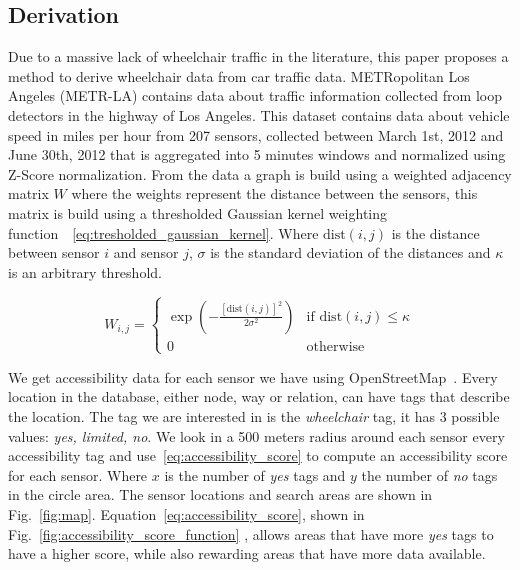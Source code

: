 \subsection{Derivation}\label{subsec:derivation}
Due to a massive lack of wheelchair traffic in the literature, this paper proposes a method to derive wheelchair data
from car traffic data.
METRopolitan Los Angeles (METR-LA) contains data about traffic information collected from loop detectors in the highway
of Los Angeles.
This dataset contains data about vehicle speed in miles per hour from 207 sensors, collected between March 1st, 2012 and
June 30th, 2012 that is aggregated into 5 minutes windows and normalized using Z-Score normalization.
From the data a graph is build using a weighted adjacency matrix $W$
where the weights represent the distance between the sensors, this matrix is build using a thresholded Gaussian kernel
weighting function~\cite{Shuman_2013}~\eqref{eq:tresholded_gaussian_kernel}.
Where $\text{dist}(i,j)$ is the distance between sensor $i$ and sensor $j$, $\sigma$
is the standard deviation of the distances and $\kappa$ is an arbitrary threshold.
\vspace{1em}

\begin{equation}
    W_{i,j} =
    \begin{cases}
        \exp\left( -\frac{\left[\text{dist}(i,j)\right]^2}{2\sigma^2} \right) & \text{if } \text{dist}(i,j) \leq \kappa
        \\
        0 & \text{otherwise}
    \end{cases}\label{eq:tresholded_gaussian_kernel}
\end{equation}
\vspace{1em}

We get accessibility data for each sensor we have using OpenStreetMap~\cite{OpenStreetMap}.
Every location in the database, either node, way or relation, can have tags that describe the location.
The tag we are interested in is the \textit{wheelchair} tag, it has 3 possible values: \textit{yes, limited, no}.
We look in a 500 meters radius around each sensor every accessibility tag and use~\eqref{eq:accessibility_score}
to compute an accessibility score for each sensor.
Where $x$ is the number of \textit{yes} tags and $y$ the number of \textit{no} tags in the circle area.
The sensor locations and search areas are shown in Fig.~\ref{fig:map}.
Equation~\eqref{eq:accessibility_score}, shown in Fig.~\ref{fig:accessibility_score_function}
,  allows areas that have more \textit{yes}
tags to have a higher score, while also rewarding areas that have more data available.

